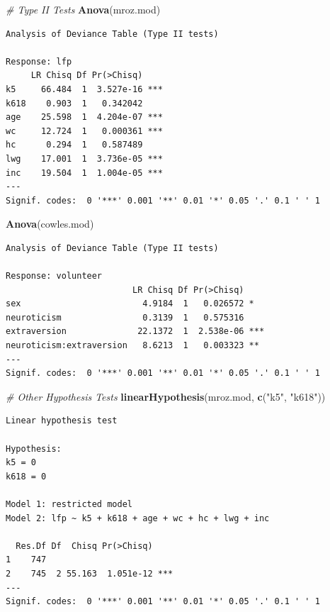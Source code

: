 \documentclass[
]{article}
\newenvironment{Shaded}{\begin{snugshade}}{\end{snugshade}}
\newcommand{\CommentTok}[1]{\textcolor[rgb]{0.56,0.35,0.01}{\textit{#1}}}
\newcommand{\KeywordTok}[1]{\textcolor[rgb]{0.13,0.29,0.53}{\textbf{#1}}}
\newcommand{\NormalTok}[1]{#1}
\newcommand{\StringTok}[1]{\textcolor[rgb]{0.31,0.60,0.02}{#1}}
\begin{document}
\begin{Shaded}
\begin{Highlighting}[]
\CommentTok{# Type II Tests }
\KeywordTok{Anova}\NormalTok{(mroz.mod)}
\end{Highlighting}
\end{Shaded}

\begin{verbatim}
Analysis of Deviance Table (Type II tests)

Response: lfp
     LR Chisq Df Pr(>Chisq)    
k5     66.484  1  3.527e-16 ***
k618    0.903  1   0.342042    
age    25.598  1  4.204e-07 ***
wc     12.724  1   0.000361 ***
hc      0.294  1   0.587489    
lwg    17.001  1  3.736e-05 ***
inc    19.504  1  1.004e-05 ***
---
Signif. codes:  0 '***' 0.001 '**' 0.01 '*' 0.05 '.' 0.1 ' ' 1
\end{verbatim}

\begin{Shaded}
\begin{Highlighting}[]
\KeywordTok{Anova}\NormalTok{(cowles.mod)}
\end{Highlighting}
\end{Shaded}

\begin{verbatim}
Analysis of Deviance Table (Type II tests)

Response: volunteer
                         LR Chisq Df Pr(>Chisq)    
sex                        4.9184  1   0.026572 *  
neuroticism                0.3139  1   0.575316    
extraversion              22.1372  1  2.538e-06 ***
neuroticism:extraversion   8.6213  1   0.003323 ** 
---
Signif. codes:  0 '***' 0.001 '**' 0.01 '*' 0.05 '.' 0.1 ' ' 1
\end{verbatim}

\begin{Shaded}
\begin{Highlighting}[]
\CommentTok{# Other Hypothesis Tests}
\KeywordTok{linearHypothesis}\NormalTok{(mroz.mod, }\KeywordTok{c}\NormalTok{(}\StringTok{"k5"}\NormalTok{, }\StringTok{"k618"}\NormalTok{))}
\end{Highlighting}
\end{Shaded}

\begin{verbatim}
Linear hypothesis test

Hypothesis:
k5 = 0
k618 = 0

Model 1: restricted model
Model 2: lfp ~ k5 + k618 + age + wc + hc + lwg + inc

  Res.Df Df  Chisq Pr(>Chisq)    
1    747                         
2    745  2 55.163  1.051e-12 ***
---
Signif. codes:  0 '***' 0.001 '**' 0.01 '*' 0.05 '.' 0.1 ' ' 1
\end{verbatim}
\end{document}
